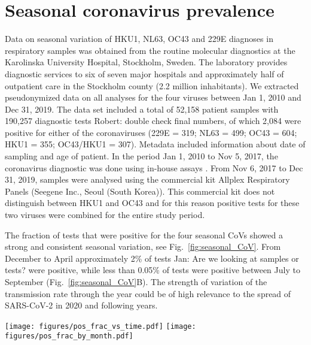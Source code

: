 \documentclass[rmp, reprint, superscriptaddress, floatfix,amsmath]{revtex4-1}
\newcommand{\Robert}[1]{{\color{celestialblue}Robert: #1}}
\newcommand{\Jan}[1]{{\color{deepsaffron}Jan: #1}}
\begin{document}
\section{Seasonal coronavirus prevalence} 

Data on seasonal variation of HKU1, NL63, OC43 and 229E diagnoses in respiratory samples was obtained from the routine molecular diagnostics at the Karolinska University Hospital, Stockholm, Sweden. The laboratory provides diagnostic services to six of seven major hospitals and approximately half of outpatient care in the Stockholm county (2.2 million inhabitants). We extracted pseudonymized data on all analyses for the four viruses between Jan 1, 2010 and Dec 31, 2019. The data set included a total of 52,158 patient samples with 190,257 diagnostic tests \Robert{double check final numbers}, of which 2,084 were positive for either of the coronaviruses (229E = 319; NL63 = 499; OC43 = 604; HKU1 = 355; OC43/HKU1 = 307). Metadata included information about date of sampling and age of patient. 
In the period Jan 1, 2010 to Nov 5, 2017, the coronavirus diagnostic was done using in-house assays \citep{tiveljung2009development}. From Nov 6, 2017 to Dec 31, 2019, samples were analysed using the commercial kit Allplex Respiratory Panels (Seegene Inc., Seoul (South Korea)). This commercial kit does not distinguish between HKU1 and OC43 and for this reason positive tests for these two viruses were combined for the entire study period. 

The fraction of tests that were positive for the four seasonal CoVs showed a strong and consistent seasonal variation, see Fig.~\ref{fig:seasonal_CoV}. 
From December to April approximately 2\%  of tests \Jan{Are we looking at samples or tests?
} were positive, while less than 0.05\% of tests were positive between July to September (Fig.~\ref{fig:seasonal_CoV}B).
The strength of variation of the transmission rate through the year could be of high relevance to the spread of SARS-CoV-2 in 2020 and following years. 

\begin{figure*}
    \centering
    \texttt{[image: figures/pos\_frac\_vs\_time.pdf]}
    \texttt{[image: figures/pos\_frac\_by\_month.pdf]}
    \caption{Seasonal variation in fraction of positive CoV test in Stockholm, Sweden.}
    \label{fig:seasonal_CoV}
\end{figure*}
\end{document}
